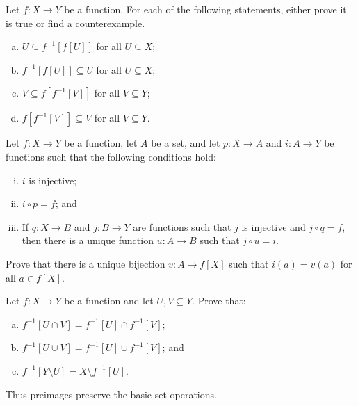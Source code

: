 \begin{chapex}
Let $f : X \to Y$ be a function. For each of the following statements, either prove it is true or find a counterexample.
\begin{multicols}{2}
\begin{enumerate}[(a)]
\item $U \subseteq f^{-1}[f[U]]$ for all $U \subseteq X$;
\item $f^{-1}[f[U]] \subseteq U$ for all $U \subseteq X$;
\item $V \subseteq f[f^{-1}[V]]$ for all $V \subseteq Y$;
\item $f[f^{-1}[V]] \subseteq V$ for all $V \subseteq Y$.
\end{enumerate}
\end{multicols}
\end{chapex}

\begin{chapex}
Let $f : X \to Y$ be a function, let $A$ be a set, and let $p : X \to A$ and $i : A \to Y$ be functions such that the following conditions hold:
\begin{enumerate}[(i)]
\item $i$ is injective;
\item $i \circ p = f$; and
\item If $q : X \to B$ and $j : B \to Y$ are functions such that $j$ is injective and $j \circ q = f$, then there is a unique function $u : A \to B$ such that $j \circ u = i$.
\end{enumerate}
Prove that there is a unique bijection $v : A \to f[X]$ such that $i(a)=v(a)$ for all $a \in f[X]$.
\end{chapex}

\begin{chapex}
Let $f : X \to Y$ be a function and let $U, V \subseteq Y$. Prove that:
\begin{enumerate}[(a)]
\item $f^{-1}[U \cap V] = f^{-1}[U] \cap f^{-1}[V]$;
\item $f^{-1}[U \cup V] = f^{-1}[U] \cup f^{-1}[V]$; and
\item $f^{-1}[Y \setminus U] = X \setminus f^{-1}[U]$.
\end{enumerate}
Thus preimages preserve the basic set operations.
\end{chapex}

